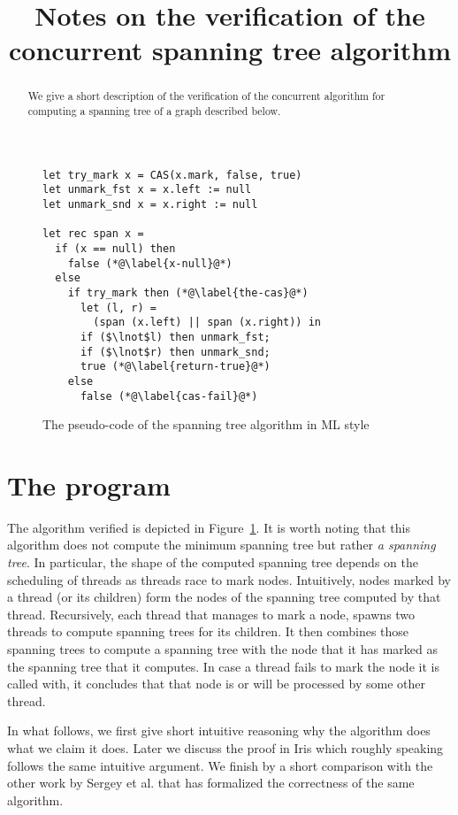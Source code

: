 \documentclass[nocopyrightspace]{sigplanconf}
\title{Notes on the verification of the concurrent spanning tree algorithm}
\begin{document}
\maketitle

\begin{abstract}
We give a short description of the verification of the concurrent algorithm for computing
a spanning tree of a graph described below.
\end{abstract}

\begin{figure}
\begin{lstlisting}[mathescape=true, language=MyML]
let try_mark x = CAS(x.mark, false, true)
let unmark_fst x = x.left := null
let unmark_snd x = x.right := null

let rec span x =
  if (x == null) then
    false (*@\label{x-null}@*)
  else
    if try_mark then (*@\label{the-cas}@*)
      let (l, r) =
        (span (x.left) || span (x.right)) in
      if ($\lnot$l) then unmark_fst;
      if ($\lnot$r) then unmark_snd;
      true (*@\label{return-true}@*)
    else
      false (*@\label{cas-fail}@*)
\end{lstlisting}
\caption{The pseudo-code of the spanning tree algorithm in ML style}
\label{fig:code}
\end{figure}

\section{The program}
The algorithm verified is depicted in Figure~\ref{fig:code}.
It is worth noting that this algorithm does not compute the minimum
spanning tree but rather \emph{a spanning tree}.
In particular, the shape of the computed spanning tree depends on the
scheduling of threads as threads race to mark nodes.
Intuitively, nodes marked by a thread (or its children) form the nodes of
the spanning tree computed by that thread.
Recursively, each thread that manages to mark a node, spawns two
threads to compute spanning trees for its children. 
It then combines those spanning trees to compute a spanning tree with
the node that it has marked as the spanning tree that it computes.
In case a thread fails to mark the node it is called with, it concludes that
that node is or will be processed by some other thread.

In what follows, we first give short intuitive reasoning why the algorithm
does what we claim it does.
Later we discuss the proof in Iris which roughly speaking follows the
same intuitive argument.
We finish by a short comparison with the other work by Sergey et al. \cite{Sergey:2015:MVF:2737924.2737964} that has formalized
the correctness of the same algorithm.
\end{document}

